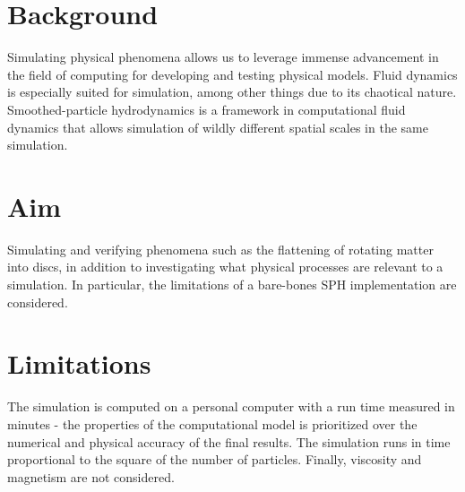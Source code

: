 \documentclass[../main.tex]{subfiles}
\begin{document}
\section{Background}
Simulating physical phenomena allows us to leverage immense advancement in the field of computing
for developing and testing physical models. Fluid dynamics is especially suited for simulation,
among other things due to its chaotical nature. Smoothed-particle hydrodynamics is a framework in
computational fluid dynamics that allows simulation of wildly different spatial scales in the same
simulation.

\section{Aim}
Simulating and verifying phenomena such as the flattening of rotating matter into discs, in addition
to investigating what physical processes are relevant to a simulation. In particular, the
limitations of a bare-bones SPH implementation are considered.

\section{Limitations}
The simulation is computed on a personal computer with a run time measured in minutes - the
properties of the computational model is prioritized over the numerical and physical accuracy of the
final results. The simulation runs in time proportional to the square of the number of particles.
Finally, viscosity and magnetism are not considered.
\end{document}
